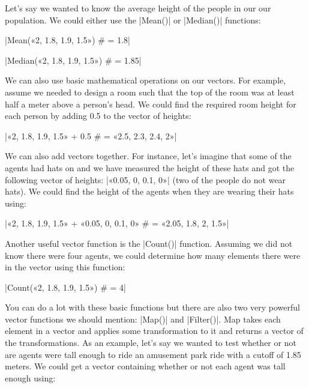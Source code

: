 \documentclass[]{memoir}
\newcommand{\DecValTok}[1]{\textcolor[rgb]{0.25,0.63,0.44}{{#1}}}
\newcommand{\FloatTok}[1]{\textcolor[rgb]{0.25,0.63,0.44}{{#1}}}
\newcommand{\FunctionTok}[1]{\textcolor[rgb]{0.02,0.16,0.49}{{#1}}}
\newcommand{\NormalTok}[1]{{#1}}
\begin{document}
Let's say we wanted to know the average height of the people in our our
population. We could either use the |\FunctionTok{Mean}\NormalTok{()}|
or |\FunctionTok{Median}\NormalTok{()}| functions:

|\FunctionTok{Mean}\NormalTok{(«2, }\FloatTok{1.8}\NormalTok{, }\FloatTok{1.9}\NormalTok{, }\FloatTok{1.5}\NormalTok{») # = }\FloatTok{1.8}|

|\FunctionTok{Median}\NormalTok{(«2, }\FloatTok{1.8}\NormalTok{, }\FloatTok{1.9}\NormalTok{, }\FloatTok{1.5}\NormalTok{») # = }\FloatTok{1.85}|

We can also use basic mathematical operations on our vectors. For
example, assume we needed to design a room such that the top of the room
was at least half a meter above a person's head. We could find the
required room height for each person by adding 0.5 to the vector of
heights:

|\NormalTok{«2, }\FloatTok{1.8}\NormalTok{, }\FloatTok{1.9}\NormalTok{, }\FloatTok{1.5}\NormalTok{» + }\FloatTok{0.5} \NormalTok{# = «2}\FloatTok{.5}\NormalTok{, }\FloatTok{2.3}\NormalTok{, }\FloatTok{2.4}\NormalTok{, }\DecValTok{2}\NormalTok{»}|

We can also add vectors together. For instance, let's imagine that some
of the agents had hats on and we have measured the height of these hats
and got the following vector of heights:
|\NormalTok{«0}\FloatTok{.05}\NormalTok{, }\DecValTok{0}\NormalTok{, }\FloatTok{0.1}\NormalTok{, }\DecValTok{0}\NormalTok{»}|
(two of the people do not wear hats). We could find the height of the
agents when they are wearing their hats using:

|\NormalTok{«2, }\FloatTok{1.8}\NormalTok{, }\FloatTok{1.9}\NormalTok{, }\FloatTok{1.5}\NormalTok{» + «0}\FloatTok{.05}\NormalTok{, }\DecValTok{0}\NormalTok{, }\FloatTok{0.1}\NormalTok{, }\DecValTok{0}\NormalTok{» # = «2}\FloatTok{.05}\NormalTok{, }\FloatTok{1.8}\NormalTok{, }\DecValTok{2}\NormalTok{, }\FloatTok{1.5}\NormalTok{»}|

Another useful vector function is the
|\FunctionTok{Count}\NormalTok{()}| function. Assuming we did not know
there were four agents, we could determine how many elements there were
in the vector using this function:

|\FunctionTok{Count}\NormalTok{(«2, }\FloatTok{1.8}\NormalTok{, }\FloatTok{1.9}\NormalTok{, }\FloatTok{1.5}\NormalTok{») # = }\DecValTok{4}|

You can do a lot with these basic functions but there are also two very
powerful vector functions we should mention:
|\FunctionTok{Map}\NormalTok{()}| and
|\FunctionTok{Filter}\NormalTok{()}|. Map takes each element in a vector
and applies some transformation to it and returns a vector of the
transformations. As an example, let's say we wanted to test whether or
not are agents were tall enough to ride an amusement park ride with a
cutoff of 1.85 meters. We could get a vector containing whether or not
each agent was tall enough using:
\end{document}
